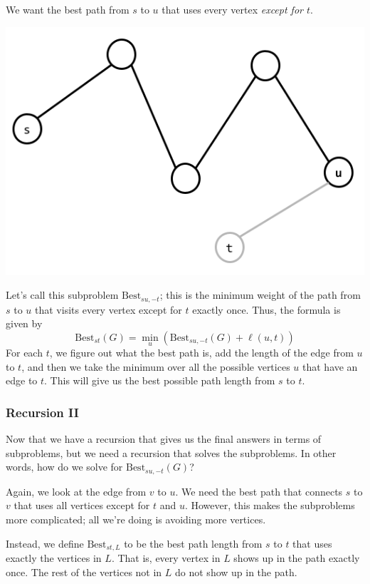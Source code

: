 \documentclass[letterpaper]{article}
\begin{document}
We want the best path from $s$ to $u$ that uses every vertex \emph{except for $t$}. 
\begin{center}
    \includegraphics[scale=0.4]{../assets/st_path_3.png}
\end{center}
Let's call this subproblem $\text{Best}_{su, -t}$; this is the minimum weight of the path from $s$ to $u$ that visits every vertex except for $t$ exactly once. Thus, the formula is given by 
\[\text{Best}_{st}(G) = \min_{u} \left(\text{Best}_{su, -t}(G) + \ell(u, t)\right)\]
For each $t$, we figure out what the best path is, add the length of the edge from $u$ to $t$, and then we take the minimum over all the possible vertices $u$ that have an edge to $t$. This will give us the best possible path length from $s$ to $t$. 

\subsubsection{Recursion II}
Now that we have a recursion that gives us the final answers in terms of subproblems, but we need a recursion that solves the subproblems. In other words, how do we solve for $\text{Best}_{su, -t}(G)$? 

\bigskip 

Again, we look at the edge from $v$ to $u$. We need the best path that connects $s$ to $v$ that uses all vertices except for $t$ and $u$. However, this makes the subproblems more complicated; all we're doing is avoiding more vertices. 

\bigskip 

Instead, we define $\text{Best}_{st, L}$ to be the best path length from $s$ to $t$ that uses exactly the vertices in $L$. That is, every vertex in $L$ shows up in the path exactly once. The rest of the vertices not in $L$ do not show up in the path. 
\end{document}

